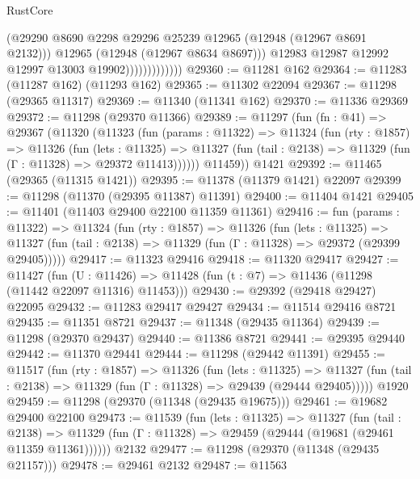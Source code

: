 \begin{lexlean}{RustCore}
\begin{coremodule}
                                (@29290
                                  @8690
                                  @2298
                                  @29296
                                  @25239
                                  @12965
                                  (@12948 (@12967 @8691 @2132)))
                                @12965
                                (@12948 (@12967 @8634 @8697)))
                              @12983
                              @12987
                              @12992
                              @12997
                              @13003
                              @19902)))))))))))))
@29360 := @11281 @162
@29364 := @11283 (@11287 @162) (@11293 @162)
@29365 := @11302 @22094
@29367 := @11298 (@29365 @11317)
@29369 := @11340 (@11341 @162)
@29370 := @11336 @29369
@29372 := @11298 (@29370 @11366)
@29389 := @11297
    (fun (fn : @41) =>
    @29367
      (@11320
        (@11323
          (fun (params : @11322) =>
          @11324
            (fun (rty : @1857) =>
            @11326
              (fun (lets : @11325) =>
              @11327 (fun (tail : @2138) => @11329 (fun (Γ : @11328) => @29372 @11413))))))
        @11459))
    @1421
@29392 := @11465 (@29365 (@11315 @1421))
@29395 := @11378 (@11379 @1421) @22097
@29399 := @11298 (@11370 (@29395 @11387) @11391)
@29400 := @11404 @1421
@29405 := @11401 (@11403 @29400 @22100 @11359 @11361)
@29416 := fun (params : @11322) =>
  @11324
    (fun (rty : @1857) =>
    @11326
      (fun (lets : @11325) =>
      @11327 (fun (tail : @2138) => @11329 (fun (Γ : @11328) => @29372 (@29399 @29405)))))
@29417 := @11323 @29416
@29418 := @11320 @29417
@29427 := @11427
    (fun (U : @11426) => @11428 (fun (t : @7) => @11436 (@11298 (@11442 @22097 @11316) @11453)))
@29430 := @29392 (@29418 @29427) @22095
@29432 := @11283 @29417 @29427
@29434 := @11514 @29416 @8721
@29435 := @11351 @8721
@29437 := @11348 (@29435 @11364)
@29439 := @11298 (@29370 @29437)
@29440 := @11386 @8721
@29441 := @29395 @29440
@29442 := @11370 @29441
@29444 := @11298 (@29442 @11391)
@29455 := @11517
    (fun (rty : @1857) =>
    @11326
      (fun (lets : @11325) =>
      @11327 (fun (tail : @2138) => @11329 (fun (Γ : @11328) => @29439 (@29444 @29405)))))
    @1920
@29459 := @11298 (@29370 (@11348 (@29435 @19675)))
@29461 := @19682 @29400 @22100
@29473 := @11539
    (fun (lets : @11325) =>
    @11327
      (fun (tail : @2138) =>
      @11329 (fun (Γ : @11328) => @29459 (@29444 (@19681 (@29461 @11359 @11361))))))
    @2132
@29477 := @11298 (@29370 (@11348 (@29435 @21157)))
@29478 := @29461 @2132
@29487 := @11563

\end{coremodule}
\end{lexlean}
